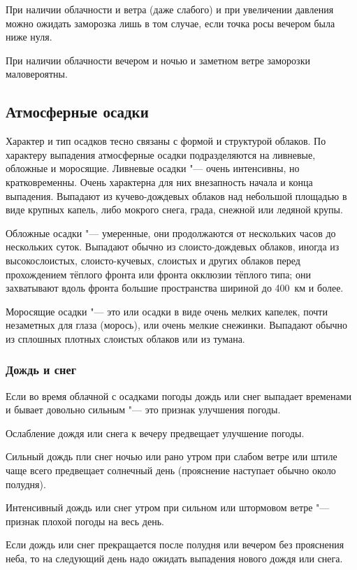 При наличии облачности и ветра (даже слабого) и при увеличении
давления можно ожидать заморозка лишь в том случае, если точка росы
вечером была ниже нуля.

 При наличии облачности вечером и ночью и заметном ветре
заморозки маловероятны.

\subsection{Атмосферные осадки}

Характер и тип осадков тесно связаны с формой и структурой облаков. По
характеру выпадения атмосферные осадки подразделяются на ливневые,
обложные и моросящие. Ливневые осадки "--- очень интенсивны, но
кратковременны. Очень характерна для них внезапность начала и конца
выпадения. Выпадают из кучево-дождевых облаков над небольшой площадью
в виде крупных капель, либо мокрого снега, града, снежной или ледяной
крупы.

Обложные осадки "--- умеренные, они продолжаются от нескольких часов до
нескольких суток. Выпадают обычно из слоисто-дождевых облаков, иногда
из высокослоистых, слоисто-кучевых, слоистых и других облаков перед
прохождением тёплого фронта или фронта окклюзии тёплого типа; они
захватывают вдоль фронта большие пространства шириной до 400~км и
более.

Моросящие осадки "--- это или осадки в виде очень мелких капелек, почти
незаметных для глаза (морось), или очень мелкие снежинки. Выпадают
обычно из сплошных плотных слоистых облаков или из тумана.

\subsubsection{Дождь и снег}

 Если во время облачной с осадками погоды дождь или снег выпадает
временами и бывает довольно сильным "--- это признак улучшения погоды.

 Ослабление дождя или снега к вечеру предвещает улучшение погоды.

 Сильный дождь пли снег ночью или рано утром при слабом ветре
или штиле чаще всего предвещает солнечный день (прояснение наступает
обычно около полудня).

 Интенсивный дождь или снег утром при сильном или штормовом
ветре "--- признак плохой погоды на весь день.

 Если дождь или снег прекращается после полудня или вечером без
прояснения неба, то на следующий день надо ожидать выпадения нового
дождя или снега.

